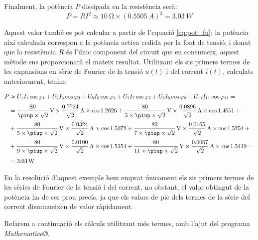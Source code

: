 \begin{exemple}
    Finalment, la potència $P$ dissipada en la resistència serà:
    \[
        P = R I^2 \approx \SI{10}{\ohm} \times (\SI{0,5505}{A})^2 =
        \SI{3,03}{W}
    \]

    Aquest valor també es pot calcular a partir de l'equació
    \eqref{eq:pot_fu}; la potència així calculada correspon a la
    potència activa cedida per la font de tensió, i donat que la
    resistència $R$ és l'únic component del circuit que en consumeix,
    aquest mètode ens proporcionarà el mateix resultat. Utilitzant els sis primers termes  de les
    expansions en sèrie de Fourier de la tensió $u(t)$ i del corrent
    $i(t)$, calculats anteriorment, tenim:

    \[\begin{split}
        P &\approx U_1 I_1 \cos\varphi_1 +  U_3 I_3 \cos\varphi_3 +
         U_5 I_5 \cos\varphi_5 + U_7 I_7 \cos\varphi_7 +
         U_9 I_9 \cos\varphi_9 + U_{11} I_{11} \cos\varphi_{11} = {}\\[0.7ex]
        &= \frac{80}{\piup\times\sqrt{2}}\si{\,V} \times
        \frac{\num{0,7724}}{\sqrt{2}}\si{\,A} \times \cos \num{1,2626} +
        \frac{80}{3\times\piup\times\sqrt{2}}\si{\,V} \times
        \frac{\num{0,0896}}{\sqrt{2}}\si{\,A} \times \cos \num{1,4651} + {} \\[0.7ex]
        &+ \frac{80}{5\times\piup\times\sqrt{2}}\si{\,V} \times
        \frac{\num{0,0324}}{\sqrt{2}}\si{\,A} \times \cos \num{1,5072} +
        \frac{80}{7\times\piup\times\sqrt{2}}\si{\,V} \times
        \frac{\num{0,0165}}{\sqrt{2}}\si{\,A} \times \cos \num{1,5254} + {}\\[0.7ex]
        &+ \frac{80}{9\times\piup\times\sqrt{2}}\si{\,V} \times
        \frac{\num{0,0100}}{\sqrt{2}}\si{\,A} \times \cos \num{1,5354} +
        \frac{80}{11\times\piup\times\sqrt{2}}\si{\,V} \times
        \frac{\num{0,0067}}{\sqrt{2}}\si{\,A} \times \cos \num{1,5419}= {}\\[0.7ex]
        &= \SI{3,03}{W}
    \end{split}\]

    En la resolució d'aquest exemple hem emprat únicament els sis
    primers termes de les sèries de Fourier de la tensió i del corrent,
    no obstant, el valor  obtingut de la potència ha de ser prou precís, ja que
    els valors de pic dels termes de la sèrie del corrent disminueixen de
    valor ràpidament.

    Refarem a continuació els càlculs utilitzant més termes, amb l'ajut
    del programa
    \emph{Mathematica®}.   


\end{exemple}
